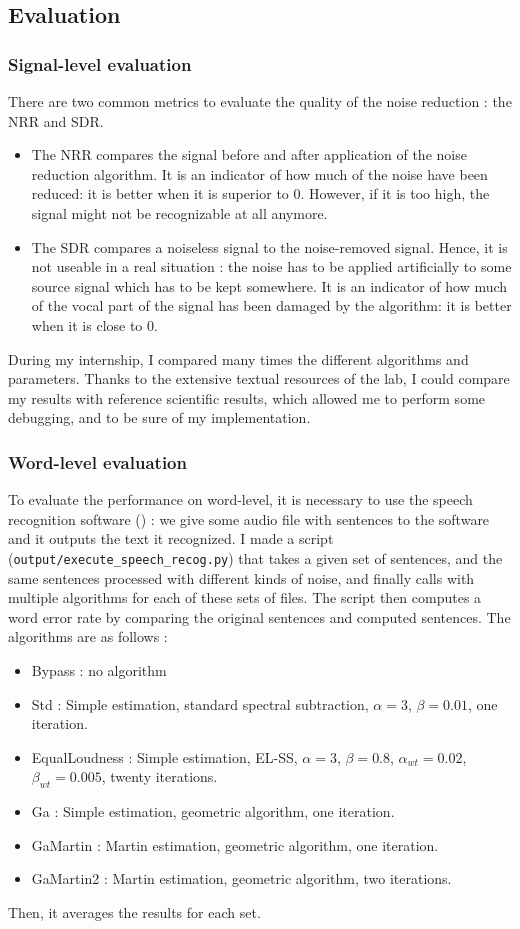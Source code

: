 \subsection{Evaluation}
\subsubsection{Signal-level evaluation}
There are two common metrics\cite{horii2013musical} to evaluate the quality of the noise reduction : the \ac{NRR} and \ac{SDR}.
\begin{itemize}
\item The \ac{NRR} compares the signal before and after application of the noise reduction algorithm. It is an indicator of how much of the noise have been reduced: it is better when it is superior to $0$. However, if it is too high, the signal might not be recognizable at all anymore.
\item The \ac{SDR} compares a noiseless signal to the noise-removed signal. Hence, it is not useable in a real situation : the noise has to be applied artificially to some source signal which has to be kept somewhere. It is an indicator of how much of the vocal part of the signal has been damaged by the algorithm: it is better when it is close to $0$.
\end{itemize}

During my internship, I compared many times the different algorithms and parameters. Thanks to the extensive textual resources of the lab, I could compare my results with reference scientific results, which allowed me to perform some debugging, and to be sure of my implementation.
\subsubsection{Word-level evaluation}
To evaluate the performance on word-level, it is necessary to use the speech recognition software () : we give some audio file with sentences to the software and it outputs the text it recognized. I made a script (\texttt{output/execute\_speech\_recog.py}) that takes a given set of sentences, and the same sentences processed with different kinds of noise, and finally calls  with multiple algorithms for each of these sets of files. The script then computes a word error rate by comparing the original sentences and computed sentences. 
The algorithms are as follows : 
\begin{itemize}
\item Bypass : no algorithm
\item Std : Simple estimation, standard spectral subtraction, $\alpha = 3$, $\beta = 0.01$, one iteration.
\item EqualLoudness : Simple estimation, EL-SS, $\alpha = 3$, $\beta = 0.8$, $\alpha_{wt} = 0.02$, $\beta_{wt} = 0.005$, twenty iterations.
\item Ga : Simple estimation, geometric algorithm, one iteration.
\item GaMartin : Martin estimation, geometric algorithm, one iteration.
\item GaMartin2 : Martin estimation, geometric algorithm, two iterations.
\end{itemize}Then, it averages the results for each set.

